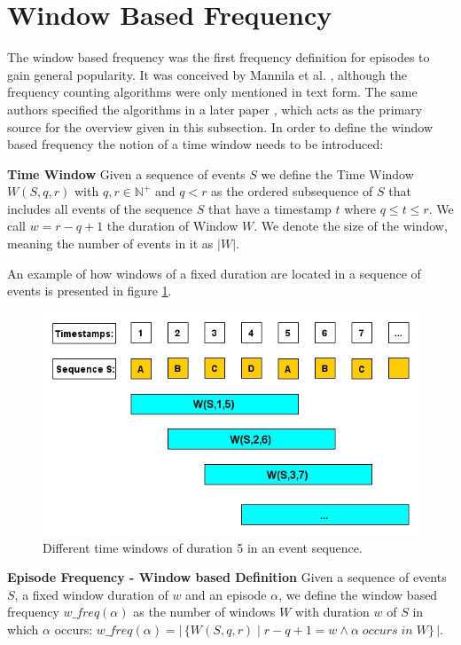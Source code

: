 \section{Window Based Frequency}
\label{sec_windowBased}
The window based frequency was the first frequency definition for episodes to gain general popularity. It was conceived by Mannila et al. \cite{mannila1995discovering}, although the frequency counting algorithms were only mentioned in text form. The same authors  specified the algorithms in a later paper \cite{mannila1997discovery}, which acts as the primary source for the overview given in this subsection. In order to define the window based frequency the notion of a time window needs to be introduced: 

\begin{mydef}
\label{def_timeWindow}
\textbf{Time Window} Given a sequence of events $S$ we define the Time Window $W(S,q,r)$ with $q,r \in \mathbb{N}^+$ and $q < r$ as the ordered subsequence of $S$ that includes all events of the sequence $S$ that have a timestamp $t$ where $q \leq t\leq r$. We call $w = r-q+1$ the duration of Window $W$. We denote the size of the window, meaning the number of events in it as $|W|$.
\end{mydef}

An example of how windows of a fixed duration are located in a sequence of events is presented in figure \ref{fig_windowBasedFrequency}.

\begin{figure}[h]
	\centering
  	\includegraphics[width=\textwidth]{windowBasedFrequency}
	\caption{Different time windows of duration 5 in an event sequence.}
	\label{fig_windowBasedFrequency}
\end{figure}


\begin{mydef}
\label{def_windowBasedFrequency}
\textbf{Episode Frequency - Window based Definition} Given a sequence of events $S$, a fixed window duration of $w$ and an episode $\alpha$, we define the window based frequency $w\_freq(\alpha )$ as the number of windows $W$ with duration $w$ of $S$ in which $\alpha$ occurs: $w\_freq(\alpha ) = |\,\{W(S,q,r) \mid r-q+1 = w \land \alpha \;occurs\; in\; W \}\,|$.
\end{mydef}


